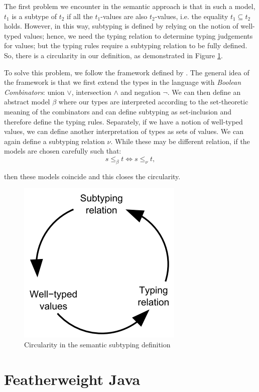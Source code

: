 \documentclass{l4proj}
\begin{document}
The first problem we encounter in the semantic approach is that in such a model, $t_{1}$ is a subtype of $t_{2}$ if all the $t_{1}$-values are also $t_{2}$-values, i.e. the equality $t_{1} \subseteq t_{2}$ holds.
However, in this way, subtyping is defined by relying on the notion of well-typed values; hence, we need the typing relation to determine typing judgements for values; but the typing rules require a subtyping relation to be fully defined.
So, there is a circularity in our definition, as demonstrated in Figure \ref{fig:circ}.

To solve this problem, we follow the framework defined by \citet{Frisch2008}.
The general idea of the framework is that we first extend the types in the language with \emph{Boolean Combinators}: union $\lor$, intersection $\land$ and negation $\neg$.
We can then define an abstract model $\beta$ where our types are interpreted according to the set-theoretic meaning of the combinators and can define subtyping as set-inclusion and therefore define the typing rules.
Separately, if we have a notion of well-typed values, we can define another interpretation of types as sets of values.
We can again define a subtyping relation $\nu$.
While these may be different relation, if the models are chosen carefully such that:
\begin{equation*}
    s \leq_{\beta} t \iff s \leq_{\nu} t,
\end{equation*}

then these models coincide and this closes the circularity.

\begin{figure}
    \centering
    \includegraphics[width=0.4\linewidth]{images/circularity.PNG}
    \caption{Circularity in the semantic subtyping definition \citep{Castagna2005}}
    \label{fig:circ}
\end{figure}

\section{Featherweight Java}
\end{document}
